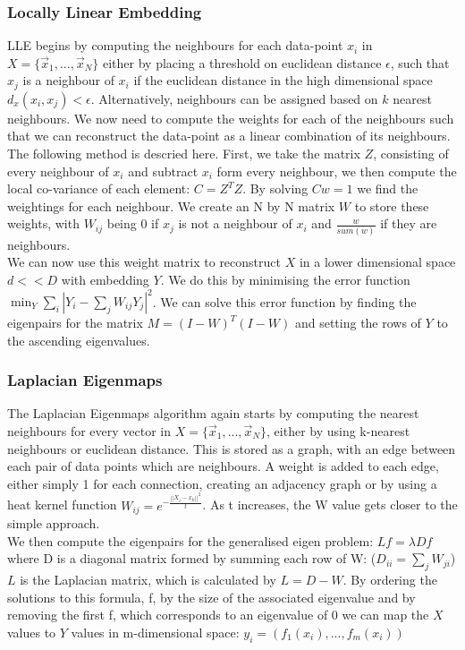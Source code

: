 \documentclass{article}
\begin{document}
\subsubsection{Locally Linear Embedding}
LLE begins by computing the neighbours for each data-point $x_i$ in $X = \{\vec{x}_1,...,\vec{x}_N\}$ either by placing a threshold on euclidean distance $\epsilon$, such that $x_j$ is a neighbour of $x_i$ if the euclidean distance in the high dimensional space $d_x(x_i,x_j) < \epsilon$. Alternatively, neighbours can be assigned based on $k$ nearest neighbours. We now need to compute the weights for each of the neighbours such that we can reconstruct the data-point as a linear combination of its neighbours. The following method is descried here.\cite{LLERoweis} First, we take the matrix $Z$, consisting of every neighbour of $x_i$ and subtract $x_i$ form every neighbour, we then compute the local co-variance of each element: $C = Z^TZ$. By solving $Cw = 1$ we find the weightings for each neighbour. We create an N by N matrix $W$ to store these weights, with $W_{ij}$ being 0 if $x_j$ is not a neighbour of $x_i$ and $\frac{w}{sum(w)}$ if they are neighbours.\\
We can now use this weight matrix to reconstruct $X$ in a lower dimensional space $d<<D$ with embedding $Y$. We do this by minimising the error function $\min_Y\sum\limits_{i}|Y_i-\sum\limits_{j}W_{ij}Y_j|^2$.\cite{ghodsi2006dimensionality} We can solve this error function by finding the eigenpairs for the matrix $M = (I-W)^T(I-W)$ and setting the rows of $Y$ to the ascending eigenvalues.
\subsubsection{Laplacian Eigenmaps}
The Laplacian Eigenmaps algorithm again starts by computing the nearest neighbours for every vector in $X = \{\vec{x}_1,...,\vec{x}_N\}$, either by using k-nearest neighbours or euclidean distance. This is stored as a graph, with an edge between each pair of data points which are neighbours. A weight is added to each edge, either simply 1 for each connection, creating an adjacency graph or by using a heat kernel function $W_{ij}=e^{-\frac{||X_i-x_k||^2}{t}}$. As t increases, the W value gets closer to the simple approach.\cite{hagueeigen} \\
We then compute the eigenpairs for the generalised eigen problem: $Lf = \lambda Df$ where D is a diagonal matrix formed by summing each row of W: ($D_{ii} = \sum\limits_jW_{ji}$) $L$ is the Laplacian matrix, which is calculated by $L = D-W$. By ordering the solutions to this formula, f, by the size of the associated eigenvalue and by removing the first f, which corresponds to an eigenvalue of 0 we can map the $X$ values to $Y$ values in m-dimensional space: $y_i = (f_1(x_i),...,f_m(x_i))$
\end{document}
